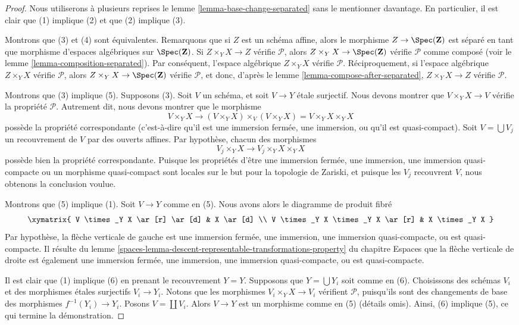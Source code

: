 \begin{proof}
Nous utiliserons à plusieurs reprises le
lemme \ref{lemma-base-change-separated}
sans le mentionner davantage. En particulier, il est clair que
(1) implique (2) et que (2) implique (3).

\medskip\noindent
Montrons que (3) et (4) sont équivalentes. Remarquons que si $Z$ est un schéma
affine, alors le morphisme $Z \to \Spec(\mathbf{Z})$ est séparé
en tant que morphisme d'espaces algébriques sur $\Spec(\mathbf{Z})$.
Si $Z \times_Y X \to Z$ vérifie $\mathcal{P}$, alors
$Z \times_Y X \to \Spec(\mathbf{Z})$ vérifie $\mathcal{P}$
comme composé (voir le
lemme \ref{lemma-composition-separated}). Par conséquent, l'espace
algébrique $Z \times_Y X$ vérifie $\mathcal{P}$. Réciproquement, si l'espace
algébrique $Z \times_Y X$ vérifie $\mathcal{P}$, alors
$Z \times_Y X \to \Spec(\mathbf{Z})$ vérifie $\mathcal{P}$, et
donc, d'après le
lemme \ref{lemma-compose-after-separated},
$Z \times_Y X \to Z$ vérifie $\mathcal{P}$.

\medskip\noindent
Montrons que (3) implique (5). Supposons (3). Soit $V$ un schéma,
et soit $V \to Y$ \'etale surjectif. Nous devons montrer que
$V \times_Y X \to V$ vérifie la propriété $\mathcal{P}$. Autrement dit,
nous devons montrer que le morphisme
$$
V \times_Y X \longrightarrow
(V \times_Y X) \times_V (V \times_Y X) = V \times_Y X \times_Y X
$$
possède la propriété correspondante (c'est-à-dire qu'il est une immersion fermée,
une immersion, ou qu'il est quasi-compact). Soit $V = \bigcup V_j$ un
recouvrement de $V$ par des ouverts affines. Par hypothèse, chacun des morphismes
$$
V_j \times_Y X \longrightarrow V_j \times_Y X \times_Y X
$$
possède bien la propriété correspondante. Puisque les propriétés d'être une immersion fermée,
une immersion, une immersion quasi-compacte ou un morphisme quasi-compact sont locales
sur le but pour la topologie de Zariski, et puisque les $V_j$ recouvrent $V$, nous obtenons la conclusion voulue.

\medskip\noindent
Montrons que (5) implique (1). Soit $V \to Y$ comme en (5).
Nous avons alors le diagramme de produit fibré
$$
\xymatrix{
V \times_Y X \ar[r] \ar[d] &
X \ar[d] \\
V \times_Y X \times_Y X \ar[r] &
X \times_Y X
}
$$
Par hypothèse, la flèche verticale de gauche est une immersion fermée,
une immersion, une immersion quasi-compacte, ou est quasi-compacte. Il résulte du
lemme \ref{spaces-lemma-descent-representable-transformations-property} du chapitre Espaces
que la flèche verticale de droite est également une immersion fermée,
une immersion, une immersion quasi-compacte, ou est quasi-compacte.

\medskip\noindent
Il est clair que (1) implique (6) en prenant le recouvrement $Y = Y$.
Supposons que $Y = \bigcup Y_i$ soit comme en (6). Choisissons des schémas $V_i$ et
des morphismes \'etales surjectifs $V_i \to Y_i$. Notons que les morphismes
$V_i \times_Y X \to V_i$ vérifient $\mathcal{P}$, puisqu'ils sont des changements de base
des morphismes $f^{-1}(Y_i) \to Y_i$. Posons $V = \coprod V_i$.
Alors $V \to Y$ est un morphisme comme en (5) (détails omis). Ainsi,
(6) implique (5), ce qui termine la démonstration.
\end{proof}

